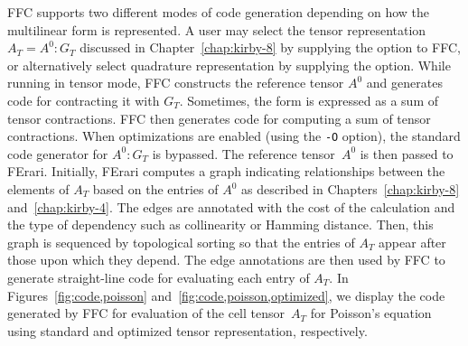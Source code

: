 FFC supports two different modes of code generation depending on how
the multilinear form is represented. A user may select the tensor
representation $A_T = A^0 : G_T$ discussed in
Chapter~\ref{chap:kirby-8} by supplying the  option to
FFC, or alternatively select quadrature representation by supplying
the  option.  While running in tensor mode, FFC
constructs the reference tensor $A^0$ and generates code for
contracting it with $G_T$. Sometimes, the form is expressed as a sum
of tensor contractions. FFC then generates code for computing a sum of
tensor contractions.  When optimizations are enabled (using the
\texttt{-O} option), the standard code generator for $A^0 : G_T$ is
bypassed. The reference tensor~$A^0$ is then passed to
FErari. Initially, FErari computes a graph indicating relationships
between the elements of $A_T$ based on the entries of $A^0$ as
described in Chapters~\ref{chap:kirby-8} and~\ref{chap:kirby-4}. The
edges are annotated with the cost of the calculation and the type of
dependency such as collinearity or Hamming distance. Then, this graph
is sequenced by topological sorting so that the entries of $A_T$ appear
after those upon which they depend. The edge annotations are then used
by FFC to generate straight-line code for evaluating each entry of
$A_T$. In Figures~\ref{fig:code,poisson}
and~\ref{fig:code,poisson,optimized}, we display the code generated by
FFC for evaluation of the cell tensor~$A_T$ for Poisson's equation
using standard and optimized tensor representation, respectively.

